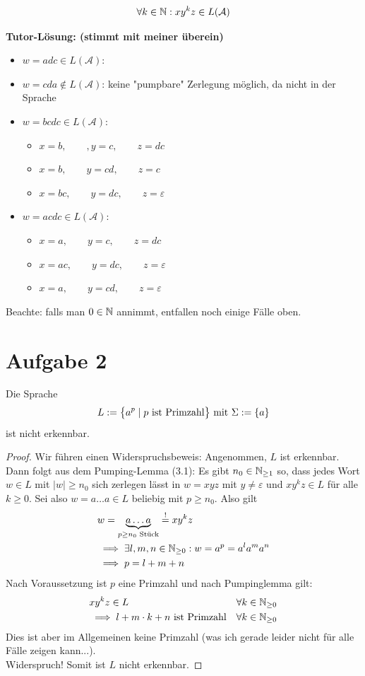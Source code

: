 \documentclass[12pt,a4paper]{article}
\newcommand{\A}{\mathcal{A}}
\begin{document}
\begin{align}\label{eqAufgabe1}
	\forall k\in\N:xy^kz\in L(\A)
\end{align}

\textbf{Tutor-Lösung: (stimmt mit meiner überein)}
\begin{itemize}
	\item $w=adc\in L(\A)$: 
	\item $w=cda\not\in L(\A)$: keine "pumpbare" Zerlegung möglich, da nicht in der Sprache
	\item $w=bcdc\in L(\A)$:
	\begin{itemize}
		\item $x=b,\qquad,y=c,\qquad z=dc$
		\item $x=b,\qquad y=cd,\qquad z=c$
		\item $x=bc,\qquad y=dc,\qquad z=\varepsilon$
	\end{itemize}
	\item $w=acdc\in L(\A)$:
	\begin{itemize}
		\item $x=a,\qquad y=c,\qquad z=dc$
		\item $x=ac,\qquad y=dc,\qquad z=\varepsilon$
		\item $x=a,\qquad y=cd,\qquad z=\varepsilon$ 
	\end{itemize}
\end{itemize}

Beachte: falls man $0\in\N$ annimmt, entfallen noch einige Fälle oben.

\section*{Aufgabe 2}
Die Sprache
\begin{align*}
	L:=\big\lbrace a^p\mid p\text{ ist Primzahl}\big\rbrace\mit\Sigma:=\lbrace a\rbrace
\end{align*}
ist nicht erkennbar.

\begin{proof}
	Wir führen einen Widerspruchsbeweis: Angenommen, $L$ ist erkennbar.
	Dann folgt aus dem Pumping-Lemma (3.1): Es gibt $n_0\in\N_{\geq1}$ so, dass jedes Wort $w\in L$ mit $|w|\geq n_0$ sich zerlegen lässt in $w=xyz$ mit $y\neq\varepsilon$ und $xy^kz\in L$ für alle $k\geq0$.
	Sei also $w=a\ldots a\in L$ beliebig mit $p\geq n_0$. Also gilt
	\begin{align*}
		&w=\underbrace{a\ldots a}_{p\geq n_0\text{ Stück}}\overset{!}= xy^k z\\
		&\implies \exists l,m,n\in\N_{\geq0}: w=a^p=a^l a^m a^n\\
		&\implies p=l+m+n
	\end{align*}
	Nach Voraussetzung ist $p$ eine Primzahl und nach Pumpinglemma gilt:
	\begin{align*}
		&x y^k z\in L &\forall k\in\N_{\geq0}\\
		&\implies l+m\cdot k+ n\text{ ist Primzahl} &\forall k\in\N_{\geq0}
	\end{align*}
	Dies ist aber im Allgemeinen keine Primzahl (was ich gerade leider nicht für alle Fälle zeigen kann...).\\
	Widerspruch! Somit ist $L$ nicht erkennbar.
\end{proof}
\end{document}
